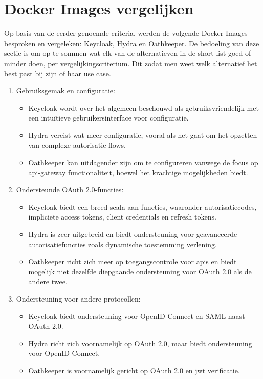 \section{Docker Images vergelijken}%
\label{sec:docker-images-vergelijken}
Op basis van de eerder genoemde criteria, werden de volgende Docker Images besproken en vergeleken: Keycloak, Hydra en Oathkeeper.
De bedoeling van deze sectie is om op te sommen wat elk van de alternatieven in de short list goed of minder doen, per vergelijkingscriterium.
Dit zodat men weet welk alternatief het best past bij zijn of haar use case.

\begin{enumerate}
  \item Gebruiksgemak en configuratie:
  \begin{itemize}
    \item Keycloak wordt over het algemeen beschouwd als gebruiksvriendelijk met een intuïtieve gebruikersinterface voor configuratie.
    \item Hydra vereist wat meer configuratie, vooral als het gaat om het opzetten van complexe autorisatie flows.
    \item Oathkeeper kan uitdagender zijn om te configureren vanwege de focus op \gls{api}-gateway functionaliteit, hoewel het krachtige mogelijkheden biedt.
  \end{itemize}
  
  \item Ondersteunde OAuth 2.0-functies:
  \begin{itemize}
    \item Keycloak biedt een breed scala aan functies, waaronder autorisatiecodes, impliciete access tokens, client credentials en refresh tokens.
    \item Hydra is zeer uitgebreid en biedt ondersteuning voor geavanceerde autorisatiefuncties zoals dynamische toestemming verlening.
    \item Oathkeeper richt zich meer op toegangscontrole voor \gls{api}s en biedt mogelijk niet dezelfde diepgaande ondersteuning voor OAuth 2.0 als de andere twee.
  \end{itemize}
  
  \item Ondersteuning voor andere protocollen:
  \begin{itemize}
    \item Keycloak biedt ondersteuning voor OpenID Connect en SAML naast OAuth 2.0.
    \item Hydra richt zich voornamelijk op OAuth 2.0, maar biedt ondersteuning voor OpenID Connect.
    \item Oathkeeper is voornamelijk gericht op OAuth 2.0 en \gls{jwt} verificatie.
  \end{itemize}
  

\end{enumerate}
